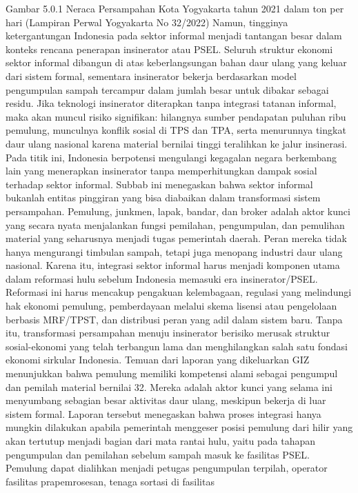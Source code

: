 \documentclass[
  letterpaper,
  DIV=11,
  numbers=noendperiod]{scrreprt}
\begin{document}
Gambar 5.0.1 Neraca Persampahan Kota Yogyakarta tahun 2021 dalam ton per
hari (Lampiran Perwal Yogyakarta No 32/2022) Namun, tingginya
ketergantungan Indonesia pada sektor informal menjadi tantangan besar
dalam konteks rencana penerapan insinerator atau PSEL. Seluruh struktur
ekonomi sektor informal dibangun di atas keberlangsungan bahan daur
ulang yang keluar dari sistem formal, sementara insinerator bekerja
berdasarkan model pengumpulan sampah tercampur dalam jumlah besar untuk
dibakar sebagai residu. Jika teknologi insinerator diterapkan tanpa
integrasi tatanan informal, maka akan muncul risiko signifikan:
hilangnya sumber pendapatan puluhan ribu pemulung, munculnya konflik
sosial di TPS dan TPA, serta menurunnya tingkat daur ulang nasional
karena material bernilai tinggi teralihkan ke jalur insinerasi. Pada
titik ini, Indonesia berpotensi mengulangi kegagalan negara berkembang
lain yang menerapkan insinerator tanpa memperhitungkan dampak sosial
terhadap sektor informal. Subbab ini menegaskan bahwa sektor informal
bukanlah entitas pinggiran yang bisa diabaikan dalam transformasi sistem
persampahan. Pemulung, junkmen, lapak, bandar, dan broker adalah aktor
kunci yang secara nyata menjalankan fungsi pemilahan, pengumpulan, dan
pemulihan material yang seharusnya menjadi tugas pemerintah daerah.
Peran mereka tidak hanya mengurangi timbulan sampah, tetapi juga
menopang industri daur ulang nasional. Karena itu, integrasi sektor
informal harus menjadi komponen utama dalam reformasi hulu sebelum
Indonesia memasuki era insinerator/PSEL. Reformasi ini harus mencakup
pengakuan kelembagaan, regulasi yang melindungi hak ekonomi pemulung,
pemberdayaan melalui skema lisensi atau pengelolaan berbasis MRF/TPST,
dan distribusi peran yang adil dalam sistem baru. Tanpa itu,
transformasi persampahan menuju insinerator berisiko merusak struktur
sosial-ekonomi yang telah terbangun lama dan menghilangkan salah satu
fondasi ekonomi sirkular Indonesia. Temuan dari laporan yang dikeluarkan
GIZ menunjukkan bahwa pemulung memiliki kompetensi alami sebagai
pengumpul dan pemilah material bernilai 32. Mereka adalah aktor kunci
yang selama ini menyumbang sebagian besar aktivitas daur ulang, meskipun
bekerja di luar sistem formal. Laporan tersebut menegaskan bahwa proses
integrasi hanya mungkin dilakukan apabila pemerintah menggeser posisi
pemulung dari hilir yang akan tertutup menjadi bagian dari mata rantai
hulu, yaitu pada tahapan pengumpulan dan pemilahan sebelum sampah masuk
ke fasilitas PSEL. Pemulung dapat dialihkan menjadi petugas pengumpulan
terpilah, operator fasilitas prapemrosesan, tenaga sortasi di fasilitas
\end{document}
